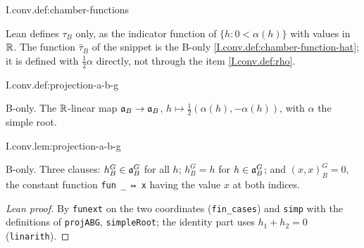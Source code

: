 \begin{definition}
\end{definition}
\begin{tfformal}{I.conv.def:chamber-functions}
\begin{tffidelity}
Lean defines $\tau_B$ only, as the indicator function of $\{h:0<\alpha(h)\}$ with values in $\mathbb{R}$. The function $\hat\tau_B$ of the snippet is the B-only \cref{I.conv.def:chamber-function-hat}; it is defined with $\frac12\alpha$ directly, not through the item \cref{I.conv.def:rho}.
\end{tffidelity}
\end{tfformal}

\begin{definition}
\bonly
{}
\end{definition}
\begin{tfformal}{I.conv.def:projection-a-b-g}
\begin{tffidelity}
B-only. The $\mathbb{R}$-linear map $\mathfrak{a}_B\to\mathfrak{a}_B$, $h\mapsto\frac12(\alpha(h),-\alpha(h))$, with $\alpha$ the simple root.
\end{tffidelity}
\end{tfformal}

\begin{lemma}
\bonly
{}
\end{lemma}
\begin{tfformal}{I.conv.lem:projection-a-b-g}
\begin{tffidelity}
B-only. Three clauses: $h_B^G\in\mathfrak{a}_B^G$ for all $h$; $h_B^G=h$ for $h\in\mathfrak{a}_B^G$; and $(x,x)_B^G=0$, the constant function \texttt{fun \_ ↦ x} having the value $x$ at both indices.
\end{tffidelity}
\end{tfformal}
\begin{proof}[Lean proof]
By \texttt{funext} on the two coordinates (\texttt{fin\_cases}) and \texttt{simp} with the definitions of \texttt{projABG}, \texttt{simpleRoot}; the identity part uses $h_1+h_2=0$ (\texttt{linarith}).
\end{proof}

